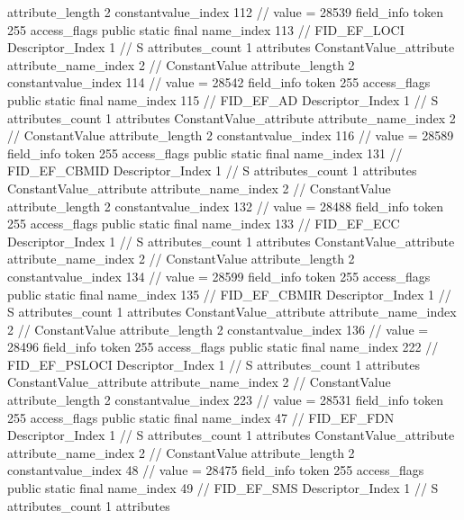 {{{{{{{					attribute_length	2
					constantvalue_index	112		// value = 28539
				}
				}
			}
			field_info {
				token	255
				access_flags	public static final
				name_index	113		// FID_EF_LOCI
				Descriptor_Index	1		// S
				attributes_count	1
				attributes {
				ConstantValue_attribute {
					attribute_name_index	2		// ConstantValue
					attribute_length	2
					constantvalue_index	114		// value = 28542
				}
				}
			}
			field_info {
				token	255
				access_flags	public static final
				name_index	115		// FID_EF_AD
				Descriptor_Index	1		// S
				attributes_count	1
				attributes {
				ConstantValue_attribute {
					attribute_name_index	2		// ConstantValue
					attribute_length	2
					constantvalue_index	116		// value = 28589
				}
				}
			}
			field_info {
				token	255
				access_flags	public static final
				name_index	131		// FID_EF_CBMID
				Descriptor_Index	1		// S
				attributes_count	1
				attributes {
				ConstantValue_attribute {
					attribute_name_index	2		// ConstantValue
					attribute_length	2
					constantvalue_index	132		// value = 28488
				}
				}
			}
			field_info {
				token	255
				access_flags	public static final
				name_index	133		// FID_EF_ECC
				Descriptor_Index	1		// S
				attributes_count	1
				attributes {
				ConstantValue_attribute {
					attribute_name_index	2		// ConstantValue
					attribute_length	2
					constantvalue_index	134		// value = 28599
				}
				}
			}
			field_info {
				token	255
				access_flags	public static final
				name_index	135		// FID_EF_CBMIR
				Descriptor_Index	1		// S
				attributes_count	1
				attributes {
				ConstantValue_attribute {
					attribute_name_index	2		// ConstantValue
					attribute_length	2
					constantvalue_index	136		// value = 28496
				}
				}
			}
			field_info {
				token	255
				access_flags	public static final
				name_index	222		// FID_EF_PSLOCI
				Descriptor_Index	1		// S
				attributes_count	1
				attributes {
				ConstantValue_attribute {
					attribute_name_index	2		// ConstantValue
					attribute_length	2
					constantvalue_index	223		// value = 28531
				}
				}
			}
			field_info {
				token	255
				access_flags	public static final
				name_index	47		// FID_EF_FDN
				Descriptor_Index	1		// S
				attributes_count	1
				attributes {
				ConstantValue_attribute {
					attribute_name_index	2		// ConstantValue
					attribute_length	2
					constantvalue_index	48		// value = 28475
				}
				}
			}
			field_info {
				token	255
				access_flags	public static final
				name_index	49		// FID_EF_SMS
				Descriptor_Index	1		// S
				attributes_count	1
				attributes {
}}}}}}

